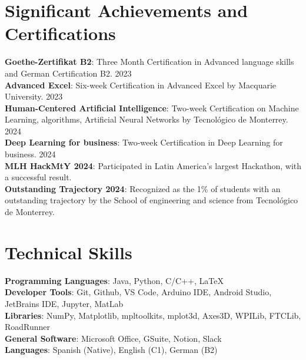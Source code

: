 \documentclass[letterpaper,11pt]{article}
\begin{document}
\section{Significant Achievements and Certifications}
\begin{itemize}[leftmargin=0.15in, label={}]
	\small{\item{
                        \textbf{Goethe-Zertifikat B2}{: Three Month Certification in Advanced language skills and German Certification B2. 2023} \\
		            \textbf{Advanced Excel}{: Six-week Certification in Advanced Excel by Macquarie University. 2023} \\
		            \textbf{Human-Centered Artificial Intelligence}{: Two-week Certification on Machine Learning, algorithms, Artificial Neural Networks by Tecnológico de Monterrey. 2024} \\
                        \textbf{Deep Learning for business}{: Two-week Certification in Deep Learning for business. 2024} \\
		            \textbf{MLH HackMtY 2024}{: Participated in Latin America's largest Hackathon, with a successful result.} \\
                        \textbf{Outstanding Trajectory 2024}{: Recognized as the 1\% of students with an outstanding trajectory by the School of engineering and science from Tecnológico de Monterrey.} \\
		      }}
\end{itemize}

\section{Technical Skills}
\begin{itemize}[leftmargin=0.15in, label={}]
	\small{\item{
		            \textbf{Programming Languages}{: Java, Python, C/C++, LaTeX} \\
		            \textbf{Developer Tools}{: Git, Github, VS Code, Arduino IDE, Android Studio,
                                JetBrains IDE, Jupyter, MatLab} \\
		            \textbf{Libraries}{: NumPy, Matplotlib, mpltoolkits, mplot3d, Axes3D, WPILib, FTCLib, RoadRunner} \\
                        \textbf{General Software}{: Microsoft Office, GSuite, Notion, Slack} \\
		            \textbf{Languages}{: Spanish (Native), English (C1), German (B2)} \\
		      }}
\end{itemize}
\end{document}
